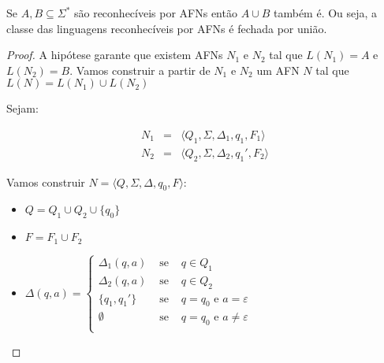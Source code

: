 \begin{lemma}
  Se $A, B \subseteq \Sigma^*$ são reconhecíveis por AFNs então $A \cup B$ também é.
  Ou seja, a classe das linguagens reconhecíveis por AFNs é fechada por união.
\end{lemma}
\begin{proof}
  A hipótese garante que existem AFNs $N_1$ e $N_2$ tal que $L(N_1) = A$ e $L(N_2) = B$.
  Vamos construir a partir de $N_1$ e $N_2$ um AFN $N$ tal que $L(N) = L(N_1) \cup L(N_2)$

  Sejam:

  \begin{eqnarray*}
    N_1 & = & \langle Q_1, \Sigma, \Delta_1, q_1, F_1 \rangle\\
    N_2 & = & \langle Q_2, \Sigma, \Delta_2, q_1', F_2 \rangle
  \end{eqnarray*}

  Vamos construir $N = \langle Q, \Sigma, \Delta, q_0, F \rangle$:

  \begin{itemize}
  \item[] $Q = Q_1 \cup Q_2 \cup \{q_0\}$
  \item[] $F = F_1 \cup F_2$
  \item[] $\Delta(q,a) = \left\{
    \begin{array}{ccc}
      \Delta_1(q, a) & \textrm{ se } & q \in Q_1\\
      \Delta_2(q, a) & \textrm{ se } & q \in Q_2\\
      \{q_1, q_1'\}   & \textrm{ se } & q = q_0 \textrm{ e } a = \varepsilon \\
      \emptyset     & \textrm{ se }  & q = q_0 \textrm{ e } a \neq \varepsilon \\
    \end{array}\right.$
  \end{itemize}


\end{proof}

